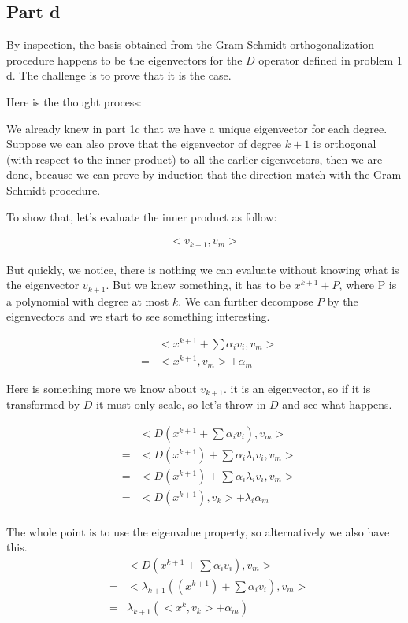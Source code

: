\subsection*{Part d}
By inspection, the basis obtained from the Gram Schmidt orthogonalization procedure happens to be the eigenvectors for the $ D $ operator defined in problem 1 d. The challenge is to prove that it is the case.

Here is the thought process:

We already knew in part 1c that we have a unique eigenvector for each degree. Suppose we can also prove that the eigenvector of degree $ k + 1 $ is orthogonal (with respect to the inner product) to all the earlier eigenvectors, then we are done, because we can prove by induction that the direction match with the Gram Schmidt procedure.

To show that, let's evaluate the inner product as follow:

\begin{eqnarray*}
  <v_{k+1}, v_{m}>
\end{eqnarray*}

But quickly, we notice, there is nothing we can evaluate without knowing what is the eigenvector $ v_{k+1} $. But we knew something, it has to be $ x^{k+1} + P $, where P is a polynomial with degree at most $ k $. We can further decompose $ P $ by the eigenvectors and we start to see something interesting.

\begin{eqnarray*}
  & & <x^{k+1} + \sum\alpha_i v_i, v_m> \\
  &=& <x^{k+1}, v_m> + \alpha_m
\end{eqnarray*}

Here is something more we know about $ v_{k+1} $. it is an eigenvector, so if it is transformed by $ D $ it must only scale, so let's throw in $ D $ and see what happens.

\begin{eqnarray*}
  & & <D(x^{k+1} + \sum\alpha_i v_i), v_m> \\
  &=& <D(x^{k+1}) + \sum \alpha_i \lambda_i v_i, v_m> \\
  &=& <D(x^{k+1}) + \sum \alpha_i \lambda_i v_i, v_m> \\
  &=& <D(x^{k+1}), v_k> + \lambda_i \alpha_m \\
\end{eqnarray*}

The whole point is to use the eigenvalue property, so alternatively we also have this.
\begin{eqnarray*}
  & & <D(x^{k+1} + \sum\alpha_i v_i), v_m> \\
  &=& <\lambda_{k+1}((x^{k+1}) + \sum \alpha_i v_i), v_m> \\
  &=& \lambda_{k+1}(<x^k, v_k> + \alpha_m) 
\end{eqnarray*}

